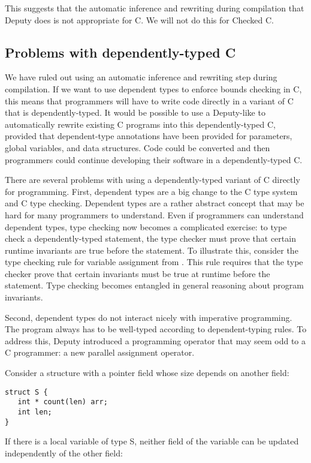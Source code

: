 This suggests that the automatic inference and rewriting during
compilation that Deputy does is not appropriate for C. We will not do
this for Checked C.

\subsection{Problems with dependently-typed {C}}

We have ruled out using an automatic inference and rewriting step during
compilation. If we want to use dependent types to enforce bounds
checking in C, this means that programmers will have to write code
directly in a variant of C that is dependently-typed. It would be
possible to use a Deputy-like to automatically rewrite existing C
programs into this dependently-typed C, provided that dependent-type
annotations have been provided for parameters, global variables, and
data structures. Code could be converted and then programmers could
continue developing their software in a dependently-typed C.

There are several problems with using a dependently-typed variant of C
directly for programming. First, dependent types are a big change to the
C type system and C type checking. Dependent types are a rather abstract
concept that may be hard for many programmers to understand. Even if
programmers can understand dependent types, type checking now becomes a
complicated exercise: to type check a dependently-typed statement, the
type checker must prove that certain runtime invariants are true before
the statement. To illustrate this, consider the type checking rule for
variable assignment from \cite{Condit2007}. This
rule requires that the type checker prove that certain invariants must
be true at runtime before the statement. Type checking becomes entangled
in general reasoning about program invariants.

Second, dependent types do not interact nicely with imperative
programming. The program always has to be well-typed according to
dependent-typing rules. To address this, Deputy introduced a programming
operator that may seem odd to a C programmer: a new parallel assignment
operator.

Consider a structure with a pointer field whose size depends on another
field:
\begin{verbatim}
struct S {
   int * count(len) arr;
   int len;
}
\end{verbatim}

If there is a local variable of type S, neither field of the variable
can be updated independently of the other field:

